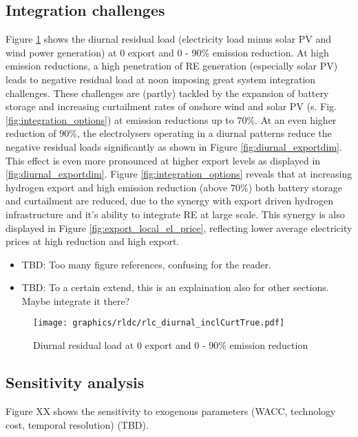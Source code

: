 \subsection{Integration challenges}
\label{subsec:integration_challenges}
Figure \ref{fig:diurnal} shows the diurnal residual load (electricity load minus solar PV and wind power generation) at 0 export and 0 - 90\% emission reduction. At high emission reductions, a high penetration of RE generation (especially solar PV) leads to negative residual load at noon imposing great system integration challenges.
These challenges are (partly) tackled by the expansion of battery storage and increasing curtailment rates of onshore wind and solar PV (s. Fig. \ref{fig:integration_options}) at emission reductions up to $70$\%. At an even higher reduction of $90$\%, the electrolysers operating in a diurnal patterns reduce the negative residual loads significantly as shown in Figure \ref{fig:diurnal_exportdim}. This effect is even more pronounced at higher export levels as displayed in \ref{fig:diurnal_exportdim}. 
Figure \ref{fig:integration_options} reveals that at increasing hydrogen export and high emission reduction (above $70$\%) both battery storage and curtailment are reduced, due to the synergy with export driven hydrogen infrastructure and it's ability to integrate RE at large scale. This synergy is also displayed in Figure \ref{fig:export_local_el_price}, reflecting lower average electricity prices at high reduction and high export.
\begin{itemize}
    \item TBD: Too many figure references, confusing for the reader.
    \item TBD: To a certain extend, this is an explaination also for other sections. Maybe integrate it there?
\end{itemize}


\begin{figure}[h!]
    \centering
    \texttt{[image: graphics/rldc/rlc\_diurnal\_inclCurtTrue.pdf]}
    \caption{Diurnal residual load at 0 export and 0 - 90\% emission reduction}
    \label{fig:diurnal}
\end{figure}

\subsection{Sensitivity analysis}
\label{subsec:sensitivity}
Figure XX shows the sensitivity to exogenous parameters (WACC, technology cost, temporal resolution) (TBD).

